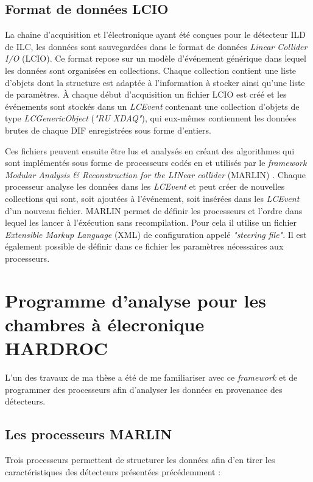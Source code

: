 \subsection{Format de données LCIO}
La chaine d'acquisition et l'électronique ayant été conçues pour le détecteur ILD de ILC, les données sont sauvegardées dans le format de données \textit{Linear Collider I/O} (LCIO)\cite{2003physics6114G}. Ce format repose sur un modèle d'événement générique  dans lequel les données sont organisées en collections. Chaque collection contient une liste d'objets dont la structure est adaptée à l'information à stocker ainsi qu'une liste de paramètres. À chaque début d'acquisition un fichier LCIO est créé et les événements sont stockés dans un \textit{LCEvent} contenant une collection d'objets de type \textit{LCGenericObject} (\textit{"RU XDAQ"}), qui eux-mêmes contiennent les données brutes de chaque DIF enregistrées sous forme d'entiers.

Ces fichiers peuvent ensuite être lus et analysés en créant des algorithmes qui sont implémentés sous forme de processeurs codés en \Cpp et utilisés par le \textit{framework Modular Analysis \& Reconstruction for the LINear collider} (MARLIN) \cite{Gaede:2006pj}. Chaque processeur analyse les données dans les \textit{LCEvent} et peut créer de nouvelles collections qui sont, soit ajoutées à l'événement, soit insérées dans les \textit{LCEvent} d'un nouveau fichier. MARLIN permet de définir les processeurs et l'ordre dans lequel les lancer à l'éxécution sans recompilation. Pour cela il utilise un fichier \textit{Extensible Markup Language} (XML) de configuration appelé \textit{"steering file"}. Il est également possible de définir dans ce fichier les paramètres nécessaires aux processeurs.

\section{Programme d'analyse pour les chambres à élecronique HARDROC}
L'un des travaux de ma thèse a été de me familiariser avec ce \textit{framework} et de programmer des processeurs afin d'analyser les données en provenance des détecteurs. 

\subsection{Les processeurs MARLIN}
Trois processeurs permettent de structurer les données afin d'en tirer les caractéristiques des détecteurs présentées précédemment :

